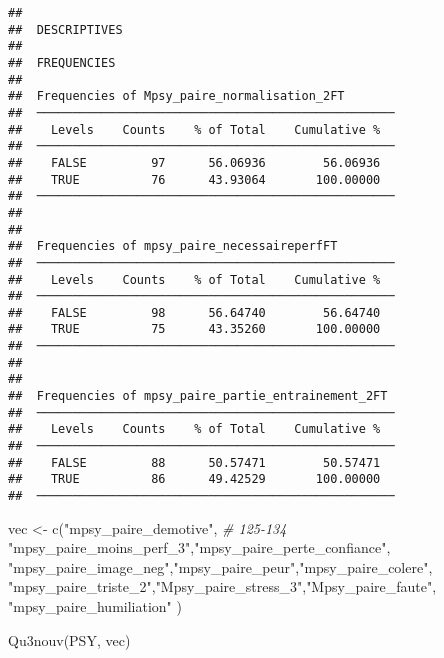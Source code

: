 \documentclass[
]{article}
\newenvironment{Shaded}{\begin{snugshade}}{\end{snugshade}}
\newcommand{\CommentTok}[1]{\textcolor[rgb]{0.56,0.35,0.01}{\textit{#1}}}
\newcommand{\FunctionTok}[1]{\textcolor[rgb]{0.00,0.00,0.00}{#1}}
\newcommand{\NormalTok}[1]{#1}
\newcommand{\OtherTok}[1]{\textcolor[rgb]{0.56,0.35,0.01}{#1}}
\newcommand{\StringTok}[1]{\textcolor[rgb]{0.31,0.60,0.02}{#1}}
\begin{document}
\begin{verbatim}
## 
##  DESCRIPTIVES
## 
##  FREQUENCIES
## 
##  Frequencies of Mpsy_paire_normalisation_2FT        
##  ────────────────────────────────────────────────── 
##    Levels    Counts    % of Total    Cumulative %   
##  ────────────────────────────────────────────────── 
##    FALSE         97      56.06936        56.06936   
##    TRUE          76      43.93064       100.00000   
##  ────────────────────────────────────────────────── 
## 
## 
##  Frequencies of mpsy_paire_necessaireperfFT         
##  ────────────────────────────────────────────────── 
##    Levels    Counts    % of Total    Cumulative %   
##  ────────────────────────────────────────────────── 
##    FALSE         98      56.64740        56.64740   
##    TRUE          75      43.35260       100.00000   
##  ────────────────────────────────────────────────── 
## 
## 
##  Frequencies of mpsy_paire_partie_entrainement_2FT  
##  ────────────────────────────────────────────────── 
##    Levels    Counts    % of Total    Cumulative %   
##  ────────────────────────────────────────────────── 
##    FALSE         88      50.57471        50.57471   
##    TRUE          86      49.42529       100.00000   
##  ──────────────────────────────────────────────────
\end{verbatim}

\begin{Shaded}
\begin{Highlighting}[]
\NormalTok{vec }\OtherTok{\textless{}{-}} \FunctionTok{c}\NormalTok{(}\StringTok{"mpsy\_paire\_demotive"}\NormalTok{,     }\CommentTok{\# 125{-}134}
         \StringTok{"mpsy\_paire\_moins\_perf\_3"}\NormalTok{,}\StringTok{"mpsy\_paire\_perte\_confiance"}\NormalTok{,  }
    \StringTok{"mpsy\_paire\_image\_neg"}\NormalTok{,}\StringTok{"mpsy\_paire\_peur"}\NormalTok{,}\StringTok{"mpsy\_paire\_colere"}\NormalTok{,}
    \StringTok{"mpsy\_paire\_triste\_2"}\NormalTok{,}\StringTok{"Mpsy\_paire\_stress\_3"}\NormalTok{,}\StringTok{"Mpsy\_paire\_faute"}\NormalTok{,}
    \StringTok{"mpsy\_paire\_humiliation"}
\NormalTok{     )}

\FunctionTok{Qu3nouv}\NormalTok{(PSY, vec)}
\end{Highlighting}
\end{Shaded}
\end{document}
